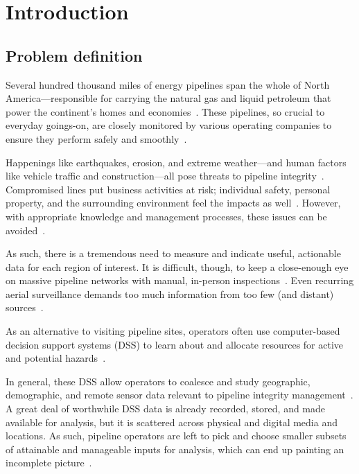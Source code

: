 \chapter{Introduction}
\label{intro}

\section{Problem definition}
\label{Problem}
Several hundred thousand miles of energy pipelines span the whole of North America---responsible for carrying the natural gas and liquid petroleum that power the continent's homes and economies~\cite{PHMSA}. These pipelines, so crucial to everyday goings-on, are closely monitored by various operating companies to ensure they perform safely and smoothly~\cite{PHMSA2013}.

Happenings like earthquakes, erosion, and extreme weather---and human factors like vehicle traffic and construction---all pose threats to pipeline integrity~\cite{MichaelBakerJr.2008,Chastain,Dunning2013}. Compromised lines put business activities at risk; individual safety, personal property, and the surrounding environment feel the impacts as well~\cite{Dunning2013}. However, with appropriate knowledge and management processes, these issues can be avoided~\cite{Dunning2013,Chastain}.

As such, there is a tremendous need to measure and indicate useful, actionable data for each region of interest. It is difficult, though, to keep a close-enough eye on massive pipeline networks with manual, in-person inspections~\cite{Dunning2013,Chastain}. Even recurring aerial surveillance demands too much information from too few (and distant) sources~\cite{Dunning2013}.

As an alternative to visiting pipeline sites, operators often use computer-based decision support systems (DSS) to learn about and allocate resources for active and potential hazards~\cite{PHMSA2013,Dunning2013}. 

In general, these DSS allow operators to coalesce and study geographic, demographic, and remote sensor data relevant to pipeline integrity management~\cite{RedlandsSDSS,Dunning2013}. A great deal of worthwhile DSS data is already recorded, stored, and made available for analysis, but it is scattered across physical and digital media and locations. As such, pipeline operators are left to pick and choose smaller subsets of attainable and manageable inputs for analysis, which can end up painting an incomplete picture~\cite{Dunning2013}.

